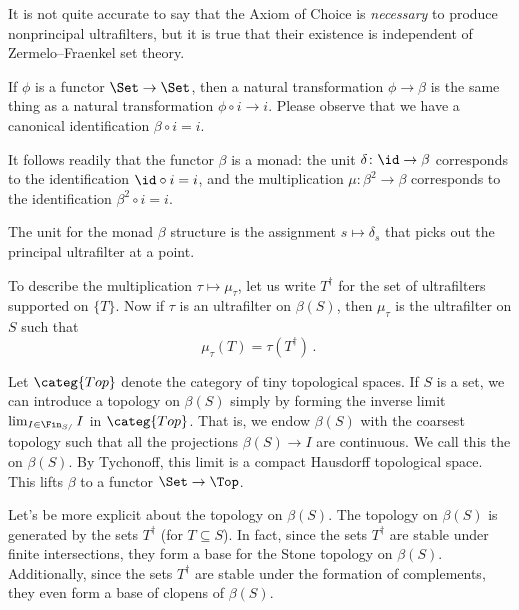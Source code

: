 \begin{nul}
	It is not quite accurate to say that the Axiom of Choice is \emph{necessary} to produce nonprincipal ultrafilters, but it is true that their existence is independent of Zermelo--Fraenkel set theory.
\end{nul}

\begin{nul}
	If $ \phi $ is a functor $ \Set \to \Set $, then a natural transformation $ \phi \to \beta $ is the same thing as a natural transformation $ \phi \circ i \to i $.
	Please observe that we have a canonical identification $ \beta \circ i = i $.

	It follows readily that the functor $ \beta $ is a monad: the unit $ \delta \colon \id \to \beta $ corresponds to the identification $ {\id} \circ i = i $, and the multiplication $ \mu \colon \beta^2 \to \beta $ corresponds to the identification $ \beta^2 \circ i = i $.

	The unit for the monad $\beta$ structure is the assignment $ s \mapsto \delta_s $ that picks out the principal ultrafilter at a point.

	To describe the multiplication $ \tau \mapsto \mu_{\tau} $, let us write $ T^{\dag} $ for the set of ultrafilters supported on $\{T\}$.
	Now if $ \tau $ is an ultrafilter on $ \beta(S) $, then $ \mu_{\tau} $ is the ultrafilter on $S$ such that
	\[
		\mu_{\tau} ( T ) = \tau ( T^{\dag} ) \period
	\]
\end{nul}

\begin{construction}
	Let $ \categ{Top} $ denote the category of tiny topological spaces.
	If $ S $ is a set, we can introduce a topology on $ \beta(S) $ simply by forming the inverse limit $ \lim_{I \in \Fin_{S/}} I $ in $ \categ{Top} $.
	That is, we endow $ \beta(S) $ with the coarsest topology such that all the projections $ \beta(S) \to I $ are continuous.
	We call this the  on $\beta(S)$.
	By Tychonoff, this limit is a compact Hausdorff topological space.
	This lifts $ \beta $ to a functor $ \Set \to \Top $.
\end{construction}

\begin{nul}
	Let's be more explicit about the topology on $ \beta(S) $.
	The topology on $ \beta(S) $ is generated by the sets $ T^{\dag} $ (for $ T \subseteq S $).
	In fact, since the sets $ T^{\dag} $ are stable under finite intersections, they form a base for the Stone topology on $ \beta(S) $.
	Additionally, since the sets $ T^{\dag} $ are stable under the formation of complements, they even form a base of clopens of $ \beta(S) $.
\end{nul}

